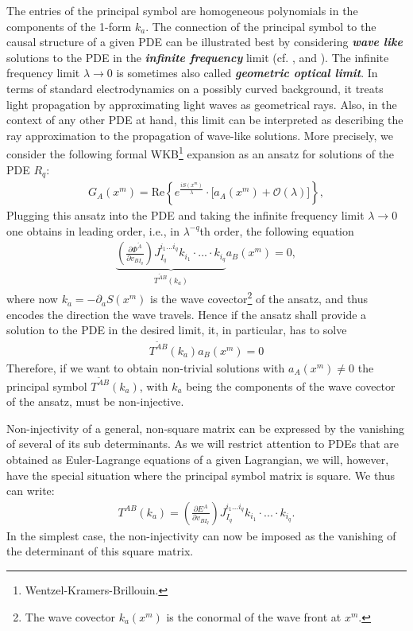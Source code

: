 The entries of the principal symbol are homogeneous polynomials in the components of the 1-form $k_a$.
The connection of the principal symbol to the causal structure of a given PDE can be illustrated best by considering \textit{\textbf{wave like}} solutions to the PDE in the \textit{\textbf{infinite frequency}} limit (cf. \cite{2012arXiv1211.1914K}, \cite{2011PhRvD..83d4047R} and \cite{2018PhRvD..97h4036D}). 
The infinite frequency limit $\lambda \rightarrow 0 $ is sometimes also called \textit{\textbf{geometric optical limit}}. In terms of standard electrodynamics on a possibly curved background, it treats light propagation by approximating light waves as geometrical rays. Also, in the context of any other PDE at hand, this limit can be interpreted as describing the ray approximation to the propagation of wave-like solutions.
More precisely, we consider the following formal WKB\footnote{Wentzel-Kramers-Brillouin.} expansion as an ansatz for solutions of the PDE $R_q$:
\begin{align}\label{waveAns}
    G_A(x^m) = \mathrm{Re}\left \{ e^{\frac{iS(x^m)}{\lambda}} \cdot   \bigl [ a_A(x^m) + \mathcal{O}(\lambda) \bigr ]\right \},
\end{align}
Plugging this ansatz into the PDE and taking the infinite frequency limit $\lambda \rightarrow 0$ one obtains in leading order, i.e., in $\lambda^{-q}$th order, the following equation
\begin{align}
    \underbrace{\left ( \frac{\partial \Phi^{\tilde{A}}}{\partial v_{BI_q}} \right ) J_{I_q}^{i_1...i_q} k_{i_1} \cdot ... \cdot k_{i_q}}_{T^{\tilde{A} B}(k_a)} a_B(x^m) = 0,
\end{align}
where now $k_a = - \partial_aS(x^m)$ is the wave covector\footnote{The wave covector $k_a(x^m)$ is the conormal of the wave front at $x^m$.} of the ansatz, and thus encodes the direction the wave travels. Hence if the ansatz shall provide a solution to the PDE in the desired limit, it, in particular, has to solve 
\begin{align}\label{solvabilityCond}
    T^{\tilde{A} B}(k_a) a_B(x^m) = 0
\end{align} 
Therefore, if we want to obtain non-trivial solutions with $a_A(x^m) \neq 0$ the principal symbol
$T^{\tilde{A} B}(k_a)$, with $k_a$ being the components of the wave covector of the ansatz, must be non-injective.

Non-injectivity of a general, non-square matrix can be expressed by the vanishing of several of its sub determinants. As we will restrict attention to PDEs that are obtained as Euler-Lagrange equations of a given Lagrangian, we will, however, have the special situation where the principal symbol matrix is square. We thus can write: 
\begin{align}
T^{A B}(k_a) =  \left ( \frac{\partial E^{A}}{\partial v_{BI_q}} \right ) J_{I_q}^{i_1...i_q} k_{i_1} \cdot ... \cdot k_{i_q}.
\end{align}
In the simplest case, the non-injectivity can now be imposed as the vanishing of the determinant of this square matrix.

